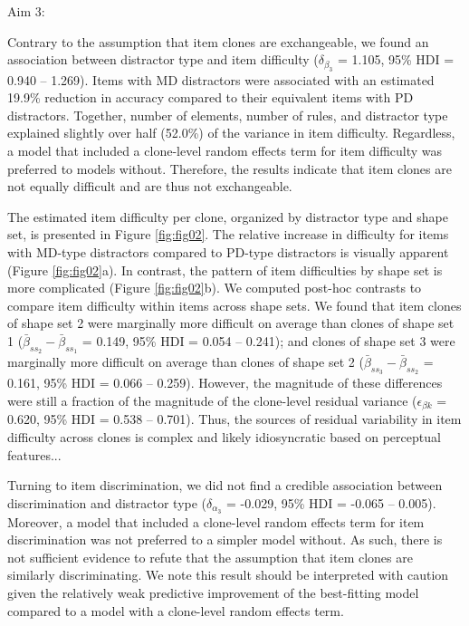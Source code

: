 \documentclass[a4paper,man,natbib]{apa6}
\makeatletter
\renewcommand{\subsubsection}{\@startsection{subsubsection}{3}
  {\z@}%
  {\b@level@two@skip}{\e@level@two@skip}%
  {\normalfont\normalsize\bfseries}}
\makeatother
\begin{document}
\subsubsection{Aim 3:}


Contrary to the assumption that item clones are exchangeable, we found an association between distractor type and item difficulty ($\delta_{\beta_3}$ = 1.105, 95\% HDI = 0.940 -- 1.269). Items with MD distractors were associated with an estimated 19.9\% reduction in accuracy compared to their equivalent items with PD distractors. Together, number of elements, number of rules, and distractor type explained slightly over half (52.0\%) of the variance in item difficulty. Regardless, a model that included a clone-level random effects term for item difficulty was preferred to models without. Therefore, the results indicate that item clones are not equally difficult and are thus not exchangeable. 

The estimated item difficulty per clone, organized by distractor type and shape set, is presented in Figure \ref{fig:fig02}. The relative increase in difficulty for items with MD-type distractors compared to PD-type distractors is visually apparent (Figure \ref{fig:fig02}a). In contrast, the pattern of item difficulties by shape set is more complicated (Figure \ref{fig:fig02}b). We computed post-hoc contrasts to compare item difficulty within items across shape sets. We found that item clones of shape set 2 were marginally more difficult on average than clones of shape set 1 ($\bar{\beta}_{ss_2} - \bar{\beta}_{ss_1}$ = 0.149, 95\% HDI = 0.054 -- 0.241); and clones of shape set 3 were marginally more difficult on average than clones of shape set 2 ($\bar{\beta}_{ss_3} - \bar{\beta}_{ss_2}$ = 0.161, 95\% HDI = 0.066 -- 0.259). However, the magnitude of these differences were still a fraction of the magnitude of the clone-level residual variance ($\epsilon_{\beta k}$ =  0.620, 95\% HDI = 0.538 -- 0.701). Thus, the sources of residual variability in item difficulty across clones is complex and likely idiosyncratic based on  perceptual features...

Turning to item discrimination, we did not find a credible association between discrimination and distractor type ($\delta_{\alpha_3}$ = -0.029, 95\% HDI = -0.065 -- 0.005). Moreover, a model that included a clone-level random effects term for item discrimination was not preferred to a simpler model without. As such, there is not sufficient evidence to refute that the assumption that item clones are similarly discriminating. We note this result should be interpreted with caution given the relatively weak predictive improvement of the best-fitting model compared to a model with a clone-level random effects term.
\end{document}
